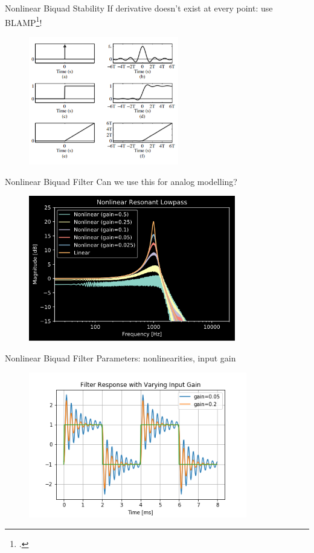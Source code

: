 \begin{frame}{Nonlinear Biquad Stability}
    If derivative doesn't exist at every point: use BLAMP\footcite{BLAMP}!
    \begin{figure}
        \includegraphics[height=2.2in]{Figures/blamp.png}
    \end{figure}
\end{frame}

\begin{frame}{Nonlinear Biquad Filter}
    Can we use this for analog modelling?
    \begin{figure}
        \includegraphics[height=2.5in]{../NonlinearBiquad/Pics/NL-LPF-Dark.png}
    \end{figure}
\end{frame}

\ifdefined\DAFX
\else
\begin{frame}{Nonlinear Biquad Filter}
    Parameters: nonlinearities, input gain
    \begin{figure}
        \includegraphics[height=2.5in]{../NonlinearBiquad/Pics/50-Hz_Response.png}
    \end{figure}
\end{frame}
\fi

